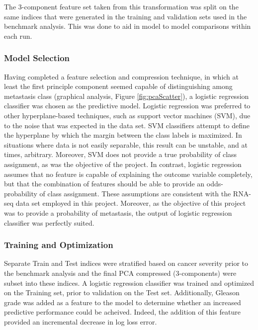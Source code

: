 \documentclass[final]{article}
\begin{document}
The 3-component feature set taken from this transformation was split on the same indices that were generated in
the training and validation sets used in the benchmark analysis.  This was done
to aid in model to model comparisons within each run.

\subsubsection{Model Selection}

Having completed a feature selection and compression technique, in which at
least the first principle component seemed capable of distinguishing among
metastasis class (graphical analysis, Figure \ref{fig:pcaScatter}), a
logistic regression classifier was chosen as the predictive model.  Logistic
regression was preferred  to other hyperplane-based techniques, such as support
vector machines (SVM), due to the noise that was expected in the
data set. SVM classifiers attempt to define the hyperplane by which the margin
between the class labels is maximized.  In situations where data is not easily
separable, this result can be unstable, and  at times, arbitrary.  Moreover, SVM
does not provide a true probability of class assignment, as was the objective of
the project.  In contrast, logistic regression assumes that no feature  is
capable of explaining the outcome variable completely, but that the combination of features
should be able to provide an odds-probability of class assignment.  These assumptions
are consistent with the RNA-seq data set employed in this project.  Moreover, as the
objective of this project was to provide a probability of metastasis, the output
of logistic regression classifier was perfectly suited.

\subsubsection{Training and Optimization}

Separate Train and Test indices were stratified based on cancer severity prior
to the benchmark analysis and the final PCA compressed (3-components) were
subset into these indices.  A logistic regression classifier was trained and
optimized on the Training set, prior to validation on the Test set.  Additionally,
Gleason grade was added as a feature to the model to determine whether an increased
predictive performance could be acheived.  Indeed, the addition of this feature
provided an incremental decrease in log loss error.
\end{document}
